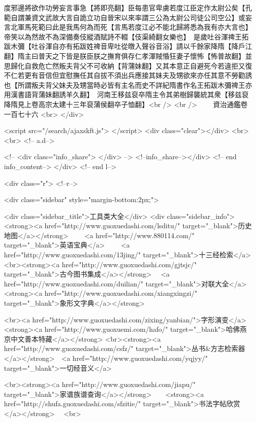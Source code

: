 度邪邊將欲作功勞妄言事急【將即亮翻】臣每患官卑虜若度江臣定作太尉公矣【孔範自謂兼資文武故大言自詭立功自晉宋以來率謂三公為太尉公司徒公司空公】或妄言北軍馬死範曰此是我馬何為而死【言馬若度江必不能北歸將悉為我有亦大言也】帝笑以為然故不為深備奏伎縱酒賦詩不輟【伎渠綺翻女樂也】　是歲吐谷渾禆王拓跋木彌【吐谷渾自亦有拓跋姓禆音卑吐從暾入聲谷音浴】請以千餘家降隋【降戶江翻】隋主曰普天之下皆是朕臣朕之撫育俱存仁孝渾賊惛狂妻子懷怖【怖普故翻】並思歸化自救危亡然叛夫背父不可收納【背蒲妹翻】又其本意正自避死今若違拒又復不仁若更有音信但宜慰撫任其自拔不須出兵應接其妹夫及甥欲來亦任其意不勞勸誘也【所謂叛夫背父妹夫及甥當時必皆有主名而史不詳紀隋書作名王拓跋木彌禆王亦用漢書語背蒲妹翻誘羊久翻】　河南王移兹裒卒隋主令其弟樹歸襲統其衆【移兹裒降隋見上卷高宗太建十三年裒蒲侯翻卒子恤翻】<br />
<br />
　　資治通鑑卷一百七十六  <br>
   </div> 

<script src="/search/ajaxskft.js"> </script>
 <div class="clear"></div>
<br>
<br>
 <!-- a.d-->

 <!--
<div class="info_share">
</div> 
-->
 <!--info_share--></div>   <!-- end info_content-->
  </div> <!-- end l-->

<div class="r">   <!--r-->



<div class="sidebar"  style="margin-bottom:2px;">

 
<div class="sidebar_title">工具类大全</div>
<div class="sidebar_info">
<strong><a href="http://www.guoxuedashi.com/lsditu/" target="_blank">历史地图</a></strong>　　
<a href="http://www.880114.com/" target="_blank">英语宝典</a>　　
<a href="http://www.guoxuedashi.com/13jing/" target="_blank">十三经检索</a>　
<br><strong><a href="http://www.guoxuedashi.com/gjtsjc/" target="_blank">古今图书集成</a></strong>　
<a href="http://www.guoxuedashi.com/duilian/" target="_blank">对联大全</a>　<strong><a href="http://www.guoxuedashi.com/xiangxingzi/" target="_blank">象形文字典</a></strong>　

<br><a href="http://www.guoxuedashi.com/zixing/yanbian/">字形演变</a>　　<strong><a href="http://www.guoxuemi.com/hafo/" target="_blank">哈佛燕京中文善本特藏</a></strong>
<br><strong><a href="http://www.guoxuedashi.com/csfz/" target="_blank">丛书&方志检索器</a></strong>　<a href="http://www.guoxuedashi.com/yqjyy/" target="_blank">一切经音义</a>　　

<br><strong><a href="http://www.guoxuedashi.com/jiapu/" target="_blank">家谱族谱查询</a></strong>　　<strong><a href="http://shufa.guoxuedashi.com/sfzitie/" target="_blank">书法字帖欣赏</a></strong>　
<br>

